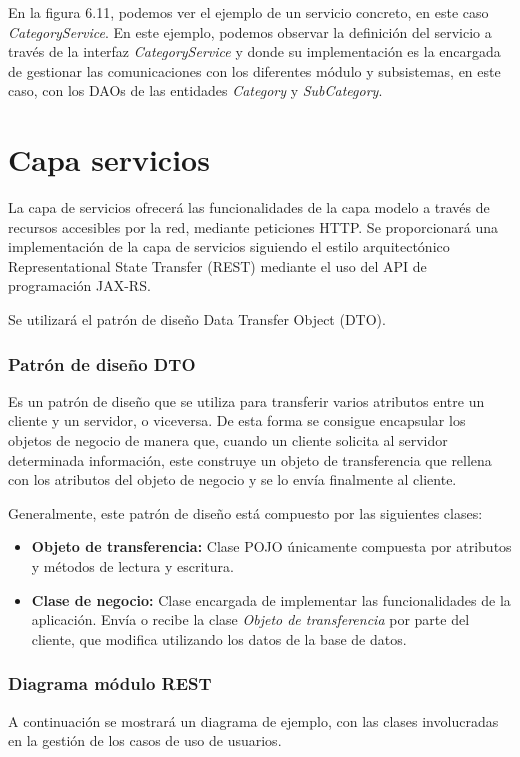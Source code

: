 En la figura 6.11, podemos ver el ejemplo de un servicio concreto, en este caso \textit{CategoryService}. En este ejemplo, podemos observar la definición del servicio a través de la interfaz \textit{CategoryService} y donde su implementación es la encargada de gestionar las comunicaciones con los diferentes módulo y subsistemas, en este caso, con los DAOs de las entidades \textit{Category} y \textit{SubCategory}.

\section{Capa servicios}
La capa de servicios ofrecerá las funcionalidades de la capa modelo a través de recursos accesibles por la red, mediante peticiones HTTP. Se proporcionará una implementación de la capa de servicios siguiendo el  estilo arquitectónico Representational State Transfer (REST) mediante el uso del API de programación JAX-RS.

Se utilizará el patrón de diseño Data Transfer Object (DTO).

\subsubsection*{Patrón de diseño DTO}
Es un patrón de diseño que se utiliza para transferir varios atributos entre un cliente y un servidor, o viceversa. De esta forma se consigue encapsular los objetos de negocio de manera que, cuando un cliente solicita al servidor determinada información, este construye un objeto de transferencia que rellena con los atributos del objeto de negocio y se lo envía finalmente al cliente.

Generalmente, este patrón de diseño está compuesto por las siguientes clases:

\begin{itemize}
	\item \textbf{Objeto de transferencia: } Clase POJO únicamente compuesta por atributos y métodos de lectura y escritura.
	\item \textbf{Clase de negocio: } Clase encargada de implementar las funcionalidades de la aplicación. Envía o recibe la clase \textit{Objeto de transferencia} por parte del cliente, que modifica utilizando los datos de la base de datos.
\end{itemize}


\subsubsection*{Diagrama módulo REST}
A continuación se mostrará un diagrama de ejemplo, con las clases involucradas en la gestión de los casos de uso de usuarios.

